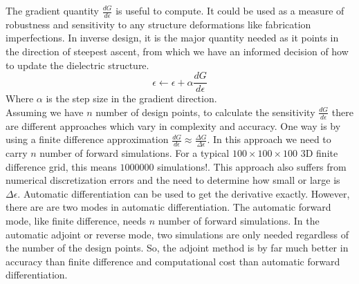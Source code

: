 \documentclass{tufte-handout}
\begin{document}
 The gradient quantity $\frac{dG}{d\epsilon}$ is  useful to compute. It could be used as a measure of robustness and sensitivity to any structure deformations like fabrication imperfections. In inverse design, it is the major quantity needed as it points in the direction of steepest ascent, from which we have an informed decision of how to update the dielectric structure.
 \begin{equation}
\epsilon \longleftarrow \epsilon + \alpha \frac{dG}{d\epsilon}
 \end{equation}
Where $\alpha$ is the step size in the gradient direction. 	
 \\
 Assuming we have $n$ number of design points, to calculate the sensitivity $\frac{dG}{d\epsilon}$ there are different approaches which vary in complexity and accuracy. One way is by using a finite difference approximation $\frac{dG}{d\epsilon} \approx \frac{\Delta G}{ \Delta\epsilon}$. In this approach we need to carry $n$ number of forward simulations. For a typical $100 \times 100 \times 100$ $3$D  finite difference grid, this means $1000000$ simulations!. This approach also suffers from numerical discretization errors and the need to determine how small or large is $\Delta \epsilon$.  Automatic differentiation can be used to get the derivative exactly. However, there are are two modes in automatic differentiation. The automatic forward mode, like finite difference, needs $n$ number of forward simulations. In the automatic adjoint or reverse mode, two simulations are only needed regardless of the number of the design points. So, the adjoint method is by far much better in accuracy than finite difference and computational cost than automatic forward differentiation.
\end{document}
